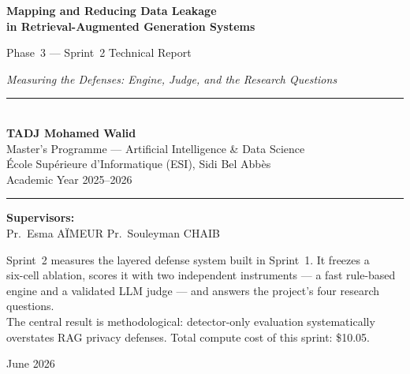 \documentclass[11pt,a4paper]{article}
\title{}
\author{}
\date{}
\begin{document}
\begin{titlepage}
\centering
\vspace*{1.4cm}

{\LARGE\bfseries Mapping and Reducing Data Leakage\\[6pt]
in Retrieval-Augmented Generation Systems\par}
\vspace{0.6cm}
{\Large Phase~3 --- Sprint~2 Technical Report\par}
\vspace{0.3cm}
{\large\itshape Measuring the Defenses: Engine, Judge, and the Research Questions\par}

\vspace{1.4cm}
\rule{0.78\textwidth}{0.5pt}\\[8pt]
{\large\bfseries TADJ Mohamed Walid}\\[4pt]
{\normalsize Master's Programme --- Artificial Intelligence \& Data Science}\\
{\normalsize \'Ecole Sup\'erieure d'Informatique (ESI), Sidi Bel Abb\`es}\\
{\normalsize Academic Year 2025--2026}\\[6pt]
\rule{0.78\textwidth}{0.5pt}

\vspace{0.9cm}
{\normalsize\textbf{Supervisors:}\\[2pt]
Pr.\ Esma A\"IMEUR \quad\textbullet\quad Pr.\ Souleyman CHAIB}

\vfill
{\small Sprint~2 measures the layered defense system built in Sprint~1. It freezes a\\
six-cell ablation, scores it with two independent instruments --- a fast rule-based\\
engine and a validated LLM judge --- and answers the project's four research questions.\\
The central result is methodological: detector-only evaluation systematically\\
overstates RAG privacy defenses. Total compute cost of this sprint: \$10.05.\par}
\vspace{0.5cm}
{\small June 2026}
\end{titlepage}
\end{document}
